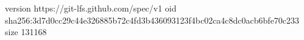 version https://git-lfs.github.com/spec/v1
oid sha256:3d7d0cc29c44e326885b72c4fd3b436093123f4bc02ca4c8dc0acb6bfe70c233
size 131168
